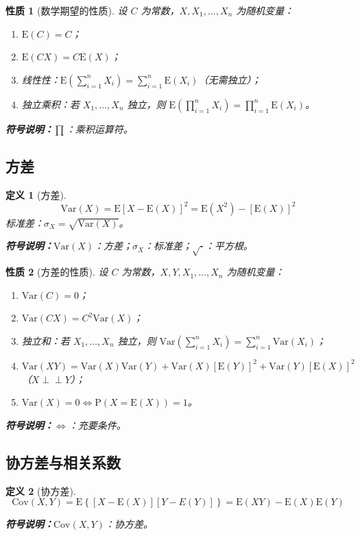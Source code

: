 \documentclass{article}
\newcommand{\Cov}{\mathrm{Cov}}
\newcommand{\E}{\mathrm{E}}
\newcommand{\D}{\mathrm{Var}}
\newcommand{\Prob}{\mathrm{P}}
\newcommand{\indep}{\perp \!\!\! \perp}
\newcommand{\symnote}[1]{\par\noindent\textbf{符号说明：}#1\par}
\theoremstyle{mytheorem}
\newtheorem{definition}{定义}[section]
\newtheorem{property}{性质}[section]
\begin{document}
\begin{property}[数学期望的性质]
设 $C$ 为常数，$X,X_1,\dots,X_n$ 为随机变量：
\begin{enumerate}
    \item $\E(C) = C$；
    \item $\E(CX) = C\E(X)$；
    \item 线性性：$\E\left(\sum_{i=1}^n X_i\right) = \sum_{i=1}^n \E(X_i)$（无需独立）；
    \item 独立乘积：若 $X_1,\dots,X_n$ 独立，则 $\E\left(\prod_{i=1}^n X_i\right) = \prod_{i=1}^n \E(X_i)$。
\end{enumerate}
\symnote{$\prod$：乘积运算符。}
\end{property}

\subsection{方差}
\begin{definition}[方差]
$$
\D(X) = \E\left[X-\E(X)\right]^2 = \E(X^2) - \left[\E(X)\right]^2
$$
标准差：$\sigma_X = \sqrt{\D(X)}$。
\symnote{$\D(X)$：方差；$\sigma_X$：标准差；$\sqrt{\cdot}$：平方根。}
\end{definition}

\begin{property}[方差的性质]
设 $C$ 为常数，$X,Y,X_1,\dots,X_n$ 为随机变量：
\begin{enumerate}
    \item $\D(C) = 0$；
    \item $\D(CX) = C^2 \D(X)$；
    \item 独立和：若 $X_1,\dots,X_n$ 独立，则 $\D\left(\sum_{i=1}^n X_i\right) = \sum_{i=1}^n \D(X_i)$；
    \item $\D(XY) = \D(X)\D(Y) + \D(X)\left[\E(Y)\right]^2 + \D(Y)\left[\E(X)\right]^2$（$X \indep Y$）；
    \item $\D(X) = 0 \iff \Prob(X = \E(X)) = 1$。
\end{enumerate}
\symnote{$\iff$：充要条件。}
\end{property}

\subsection{协方差与相关系数}
\begin{definition}[协方差]
$$
\Cov(X,Y) = \E\left\{[X-\E(X)][Y-E(Y)]\right\} = \E(XY) - \E(X)\E(Y)
$$
\symnote{$\Cov(X,Y)$：协方差。}
\end{definition}
\end{document}
